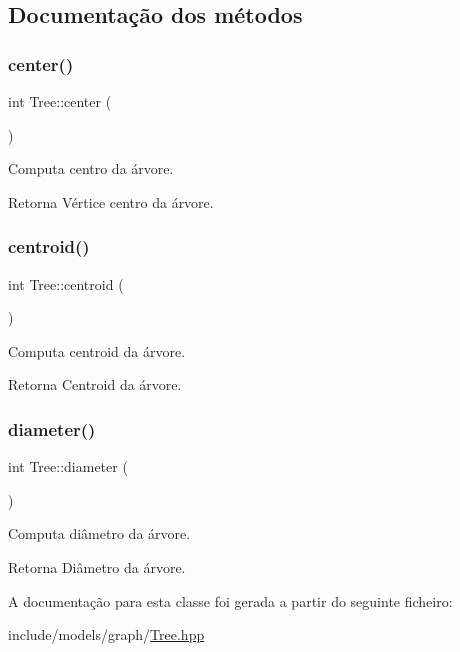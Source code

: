 \subsection{Documentação dos métodos}
\mbox{\label{classTree_af13c3d7650185d8703c5483d3b24a5e5}} 
\subsubsection{\texorpdfstring{center()}{center()}}
{\footnotesize\ttfamily int Tree\+::center (\begin{DoxyParamCaption}{ }\end{DoxyParamCaption})}

Computa centro da árvore. \begin{DoxyReturn}{Retorna}
Vértice centro da árvore. 
\end{DoxyReturn}
\mbox{\label{classTree_a568a379c4a528faf192b2a97ac3a20bb}} 
\subsubsection{\texorpdfstring{centroid()}{centroid()}}
{\footnotesize\ttfamily int Tree\+::centroid (\begin{DoxyParamCaption}{ }\end{DoxyParamCaption})}

Computa centroid da árvore. \begin{DoxyReturn}{Retorna}
Centroid da árvore. 
\end{DoxyReturn}
\mbox{\label{classTree_a8a296a740609d29e4ff991549b7f8f92}} 
\subsubsection{\texorpdfstring{diameter()}{diameter()}}
{\footnotesize\ttfamily int Tree\+::diameter (\begin{DoxyParamCaption}{ }\end{DoxyParamCaption})}

Computa diâmetro da árvore. \begin{DoxyReturn}{Retorna}
Diâmetro da árvore. 
\end{DoxyReturn}


A documentação para esta classe foi gerada a partir do seguinte ficheiro\+:\begin{DoxyCompactItemize}
\item 
include/models/graph/\mbox{\hyperlink{Tree_8hpp}{Tree.\+hpp}}\end{DoxyCompactItemize}
